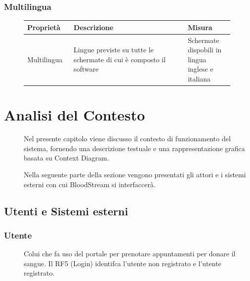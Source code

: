 \documentclass{article}
\begin{document}
\subsubsection{Multilingua}\label{rnf_8}
\begin{description}
	\item[]
	    
	\begin{table}[!htbp]
		\begin{tabular} {|>{\raggedright\arraybackslash}m{0.20\linewidth} | >{\raggedright\arraybackslash}m{0.50\linewidth}|>{\raggedright\arraybackslash}m{0.20\linewidth}|}
			\hline
			\textbf{Proprietà} & \textbf{Descrizione}                                                 & \textbf{Misura}                                  \\ \hline
			Multilingua         & Lingue previste su tutte le schermate di cui è composto il software & Schermate dispobili in lingua inglese e italiana \\ \hline
		\end{tabular}
	\end{table}
	    
\end{description}

\clearpage

\section{Analisi del Contesto}
\begin{description}
	\item[] Nel presente capitolo viene discusso il contesto di funzionamento del sistema, fornendo una descrizione testuale e una rappresentazione grafica basata su Context Diagram.
	
	Nella seguente parte della sezione vengono presentati gli attori e i sistemi esterni con cui BloodStream si interfaccerà. 
\end{description}

\subsection{Utenti e Sistemi esterni}


\subsubsection{Utente} 
\begin{description}
	\item[] Colui che fa uso del portale per prenotare appuntamenti per donare il sangue. Il RF5 (Login) identifca l'utente non registrato e l'utente registrato.
\end{description}
\end{document}
